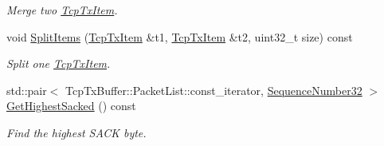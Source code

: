 \begin{DoxyCompactItemize}
\begin{DoxyCompactList}\small\item\em Merge two \hyperlink{classns3_1_1TcpTxItem}{Tcp\+Tx\+Item}. \end{DoxyCompactList}\item 
void \hyperlink{classns3_1_1TcpTxBuffer_a34d85565e5a51b10a33444ed47415f2f}{Split\+Items} (\hyperlink{classns3_1_1TcpTxItem}{Tcp\+Tx\+Item} \&t1, \hyperlink{classns3_1_1TcpTxItem}{Tcp\+Tx\+Item} \&t2, uint32\+\_\+t size) const 
\begin{DoxyCompactList}\small\item\em Split one \hyperlink{classns3_1_1TcpTxItem}{Tcp\+Tx\+Item}. \end{DoxyCompactList}\item 
std\+::pair$<$ Tcp\+Tx\+Buffer\+::\+Packet\+List\+::const\+\_\+iterator, \hyperlink{group__network_gacb2070e4e98d2d5135c9bede58f07a03}{Sequence\+Number32} $>$ \hyperlink{classns3_1_1TcpTxBuffer_a6c411d008d8905f81ea087566f0b473b}{Get\+Highest\+Sacked} () const 
\begin{DoxyCompactList}\small\item\em Find the highest S\+A\+CK byte. \end{DoxyCompactList}\end{DoxyCompactItemize}
